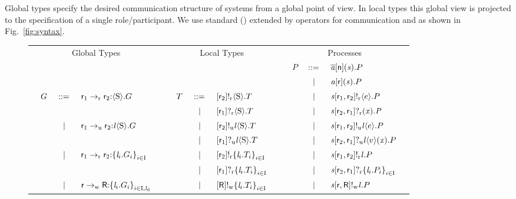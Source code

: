 Global types specify the desired communication structure of systems from a global point of view.
In local types this global view is projected to the specification of a single role/participant.
We use standard \MPST (\cite{HondaYoshidaCarbone08,hondaYoshidaCarbone16}) extended by operators for \unrel communication and \weakR as shown in Fig.~\ref{fig:syntax}.

\begin{figure}[t]
	\centering
	\renewcommand{\tabcolsep}{1pt}
	\begin{tabular}{|llclr|llclr|llclr|}
		\hline
		\multicolumn{5}{|c|}{Global Types} & \multicolumn{5}{c|}{Local Types} & \multicolumn{5}{c|}{Processes}\\
		&&&&& &&&&& & $ P $ & $ \deffTerms $ & $ \PReq{\Chan[a]}{\Role[n]}{\Chan}{P} $ &\\
		&&&&& &&&&& & & $ \sepTerms $ & $ \PAcc{\Chan[a]}{\Role}{\Chan}{P} $ &\\
		& \multirow{2}{*}{$ \GT $} & \multirow{2}{*}{$ \deffTerms $} & \multirow{2}{*}{$ \GComR{\Role_1}{\Role_2}{\Sort}{\GT} $} & & & $ \LT $ & $ \deffTerms $ & $ \LSendR{\Role_2}{\Sort}{\LT} $ & & & & $ \sepTerms $ & $ \PSendR{\Chan}{\Role_1}{\Role_2}{\Expr}{P} $ &\\
		&&&&& & & $ \sepTerms $ & $ \LGetR{\Role_1}{\Sort}{\LT} $ & & & & $ \sepTerms $ & $ \PGetR{\Chan}{\Role_2}{\Role_1}{\Args}{\PT} $ &\\
		& & \multirow{2}{*}{$ \sepTerms $} & \multirow{2}{*}{$ \GComU{\Role_1}{\Role_2}{\Label}{\Sort}{\GT} $} & & & & $ \sepTerms $ & $ \LSendU{\Role_2}{\Label}{\Sort}{\LT} $ & & & & $ \sepTerms $ & $ \PSendU{\Chan}{\Role_1}{\Role_2}{\Label}{\Expr}{P} $ &\\
		&&&&& & & $ \sepTerms $ & $ \LGetU{\Role_1}{\Label}{\Sort}{\LT} $ & & & & $ \sepTerms $ & $ \PGetU{\Chan}{\Role_2}{\Role_1}{\Label}{\Expr[v]}{\Args}{P} $ &\\
		& & \multirow{2}{*}{$ \sepTerms $} & \multirow{2}{*}{$ \GBranR{\Role_1}{\Role_2}{\Set{ \Label_i.\GT_i}_{i \in \indexSet}} $} & & & & $ \sepTerms $ & $ \LSelR{\Role_2}{\Set{ \Label_i.\LT_i }_{i \in \indexSet}} $ & & & & $ \sepTerms $ & $ \PSelR{\Chan}{\Role_1}{\Role_2}{\Label}{P} $ &\\
		&&&&& & & $ \sepTerms $ & $ \LBranR{\Role_1}{\Set{ \Label_i.\LT_i }_{i \in \indexSet}} $ & & & & $ \sepTerms $ & $ \PBranR{\Chan}{\Role_2}{\Role_1}{\Set{ \Label_i.P_i }_{i \in \indexSet}} $ &\\
		& & \multirow{2}{*}{$ \sepTerms $} & \multirow{2}{*}{$ \GBranW{\Role}{\Role[R]}{\Set{ \Label_i.\GT_i }_{i \in \indexSet, \LabelD}} $} & & & & $ \sepTerms $ & $ \LSelW{\Role[R]}{\Set{ \Label_i.\LT_i }_{i \in \indexSet}} $ & & & & $ \sepTerms $ & $ \PSelW{\Chan}{\Role}{\Role[R]}{\Label}{P} $ &\\

\end{tabular}
\end{figure}
